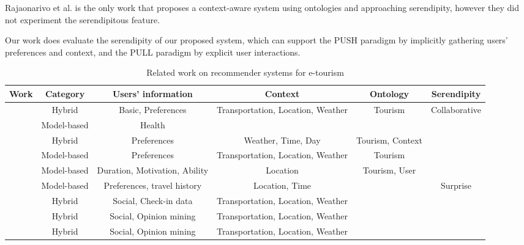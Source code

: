 Rajaonarivo et al. \cite{rajaonarivo2019rec} is the only work that proposes a context-aware system using ontologies and approaching serendipity, however they did not experiment the serendipitous feature.

Our work does evaluate the serendipity of our proposed system, which can support the PUSH paradigm by implicitly gathering users' preferences and context, and the PULL paradigm by explicit user interactions.

\begin{table*}[h!]
    \centering
    \caption{Related work on recommender systems for e-tourism}
    \label{table:related-work}
    \begin{tabular}{|c|c|c|c|c|c|} 
        \hline
        \textbf{Work} & \textbf{Category} & \textbf{Users' information} & \textbf{Context}&\textbf{Ontology}&\textbf{Serendipity} \\
        \hline \hline 

        \cite{rajaonarivo2019rec} & Hybrid & Basic, Preferences & Transportation, Location, Weather & Tourism & Collaborative \\ \hline

        \cite{santos2019using} & Model-based & Health & & & \\ \hline

        \cite{bahramian_abbaspour_claramunt_2017} & Hybrid & Preferences & Weather, Time, Day & Tourism, Context & \\ \hline

        \cite{arigi2018context} & Model-based & Preferences & Transportation, Location, Weather & Tourism & \\ \hline

        \cite{ruotsalo2013smartmuseum} & Model-based & Duration, Motivation, Ability & Location & Tourism, User & \\ \hline

        \cite{shen2016attraction} & Model-based & Preferences, travel history & Location, Time & & Surprise \\ \hline

        \cite{kesorn2017personalized} & Hybrid & Social, Check-in data & Transportation, Location, Weather & & \\ \hline

        \cite{logesh2019exploring} & Hybrid & Social, Opinion mining & Transportation, Location, Weather &  & \\ \hline

        \cite{logesh2018personalised} & Hybrid & Social, Opinion mining & Transportation, Location, Weather &  & \\ \hline


\end{tabular}
\end{table*}
